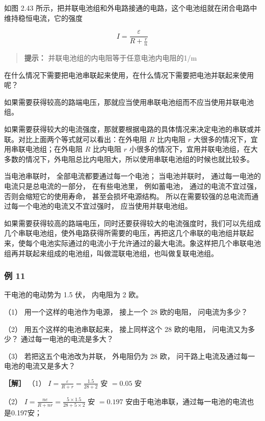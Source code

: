 如图 2.43
所示，把并联电池组和外电路接通的电路，这个电池组就在闭合电路中维持稳恒电流，它的强度

\[
I = \frac{\varepsilon}{R + \frac{r}{n}} \tag{2.7}
\]

\begin{quote}
\textbf{提示：} 并联电池组的内电阻等于任意电池内电阻的1/m
\end{quote}

在什么情况下需要把电池串联起来使用，在什么情况下需要把电池并联起来使用呢？

如果需要获得较高的路端电压，那就应当使用串联电池组而不应当使用并联电池组。

如果需要获得较大的电流强度，那就要根据电路的具体情况来决定电池的串联或并联。对比上面两个等式就可以看出：在外电阻
\(R\) 比内电阻 \(r\) 大很多的情况下，宜用串联电池组；在外电阻 \(R\)
比内电阻 \(r\)
小很多的情况下，宜用并联电池组，在大多数的情况下，外电阻总比内电阻大，所以使用串联电池组的时候也就比较多。

当电池串联时， 全部电流都要通过每一个电池； 当电池并联时，
通过每一电池的电流只是总电流的一部分， 在有些电池里， 例如蓄电池，
通过的电流不宜过强， 否则会缩短它的使用寿命， 甚至会损坏电源结构。
所以在需要较强的总电流而通过每一个电池的电流又不宜过强时，
应当使用并联电池组。

如果需要获得较高的路端电压，同时还要获得较大的电流强度时，我们可以先组成几个串联电池组，使外电路获得所需要的电压，再把这几个串联的电池组并联起来，使每个电池实际通过的电流小于允许通过的最大电流。象这样把几个串联电池组再并联起来组成的电池组，叫做混联电池组，也叫做复联电池组。

\subsubsection{例 11}\label{ux4f8b-11-1}

干电池的电动势为 1.5 伏， 内电阻为 2 欧。

（1） 用一个这样的电池作为电源， 接上一个 28 欧的电阻， 问电流为多少？

（2） 用五个这样的电池串联起来， 接上同样这个 28 欧的电阻，
问电流又为多少？ 通过每一电池的电流是多大？

（3） 若把这五个电池改为并联， 外电阻仍为 28 欧，
问干路上电流及通过每一电池的电流又是多大？

\textbf{［解］} （1）
\(I = \frac{\varepsilon}{R + r} = \frac{1.5}{28 + 2}\) 安 \(= 0.05\) 安

（2） \(I = \frac{ne}{R + nr} = \frac{5 \times 1.5}{28+5\times2}\) 安
\(= 0.197\) 安由于电池串联，通过每一电池的电流也是0.197安；

